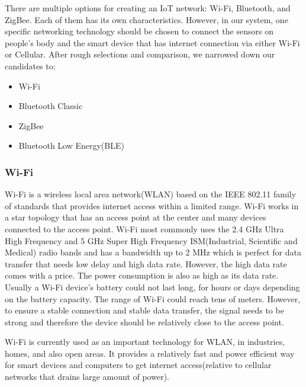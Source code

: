 \documentclass[10pt,journal,final,a4paper,nofonttune]{IEEEtran}
\begin{document}
There are multiple options for creating an IoT network: Wi-Fi, Bluetooth, and ZigBee. 
Each of them has its own characteristics. However, in our system, one specific networking 
technology should be chosen to connect the sensors on people's body and the smart device that has 
internet connection via either Wi-Fi or Cellular. After rough selections and comparison, we narrowed down our candidates to:

\begin{itemize}
    \item Wi-Fi
    \item Bluetooth Classic
    \item ZigBee
    \item Bluetooth Low Energy(BLE)
\end{itemize}

\subsubsection{Wi-Fi}
Wi-Fi is a wireless local area network(WLAN) based on the IEEE 802.11 family of standards that provides internet access within a limited range.
Wi-Fi works in a star topology that has an access point at the center and many devices connected to the access point.
Wi-Fi most commonly uses the 2.4 GHz Ultra High Frequency and 5 GHz Super High Frequency ISM(Industrial, Scientific and Medical) radio bands and has a bandwidth up to 2 MHz which is perfect for data transfer that needs low delay and high data rate. 
However, the high data rate comes with a price. The power consumption is also as high as its data rate. Usually a Wi-Fi device's battery could not last long, for hours or days depending on the battery capacity. 
The range of Wi-Fi could reach tens of meters. However, to ensure a stable connection and stable data transfer, the signal needs to be strong and therefore the device should be relatively close to the access point.

Wi-Fi is currently used as an important technology for WLAN, in industries, homes, and also open areas. It provides a relatively fast and power efficient way for smart devices and computers to get internet access(relative to cellular networks that drains large amount of power). 
\end{document}
